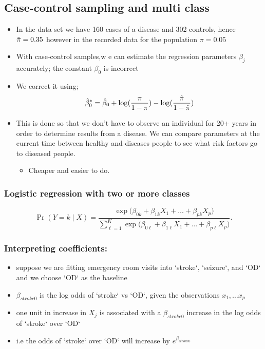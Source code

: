 \documentclass{article}
\begin{document}
\subsection{Case-control sampling and multi class}
\begin{itemize}
    \item In the data set we have 160 cases of a disease and 302 controls, hence $\Tilde{\pi} = 0.35$ however in the recorded data for the population $\pi = 0.05$
    \item With case-control samples,w e can estimate the regression parameters $\beta_j$ accurately; the constant $\beta_0$ is incorrect
    \item We correct it using;
    \begin{equation*}
        \hat{\beta}^*_0 = \hat{\beta}_0 + \log(\frac{\pi}{1 - \pi}) - \log( \frac{\Tilde{\pi}}{1 - \Tilde{\pi}})
    \end{equation*}
    \item This is done so that we don't have to observe an individual for 20+ years in order to determine results from a disease. We can compare parameters at the current time between healthy and diseases people to see what risk factors go to diseased people.
    \begin{itemize}
        \item Cheaper and easier to do.
    \end{itemize}
\end{itemize}

\subsubsection{Logistic regression with two or more classes}
\begin{equation*}
    \Pr(Y = k \mid X)
= 
\frac{
  \exp\bigl(\beta_{0k} + \beta_{1k}X_{1} + \dots + \beta_{pk}X_{p}\bigr)
}{
  \displaystyle\sum_{\ell=1}^{K}
    \exp\bigl(\beta_{0\ell} + \beta_{1\ell}X_{1} + \dots + \beta_{p\ell}X_{p}\bigr)
}.
\end{equation*}
\subsubsection{Interpreting coefficients:} 
\begin{itemize}
    \item suppose we are fitting emergency room visits into `stroke`, `seizure`, and `OD` and we choose `OD` as the baseline
    \item $\beta_{stroke0}$ is the log odds of `stroke` vs `OD`, given the observations $x_{1}, \dots x_{p}$
    \item one unit in increase in $X_{j}$ is associated with a $\beta_{stroke0}$ increase in the log odds of `stroke` over `OD`
    \item i.e the odds of `stroke` over `OD` will increase by $e^{\beta_{stroke0}}$
\end{itemize}
\end{document}
